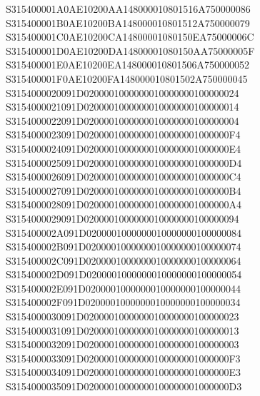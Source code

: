 \documentclass[12pt,a4paper]{article}
\begin{document}
\begin{framed}
{S315400001A0AE10200AA148000010801516A750000086\newline
S315400001B0AE10200BA148000010801512A750000079\newline
S315400001C0AE10200CA14800001080150EA75000006C\newline
S315400001D0AE10200DA14800001080150AA75000005F\newline
S315400001E0AE10200EA148000010801506A750000052\newline
S315400001F0AE10200FA148000010801502A750000045\newline
S3154000020091D0200001000000010000000100000024\newline
S3154000021091D0200001000000010000000100000014\newline
S3154000022091D0200001000000010000000100000004\newline
S3154000023091D02000010000000100000001000000F4\newline
S3154000024091D02000010000000100000001000000E4\newline
S3154000025091D02000010000000100000001000000D4\newline
S3154000026091D02000010000000100000001000000C4\newline
S3154000027091D02000010000000100000001000000B4\newline
S3154000028091D02000010000000100000001000000A4\newline
S3154000029091D0200001000000010000000100000094\newline
S315400002A091D0200001000000010000000100000084\newline
S315400002B091D0200001000000010000000100000074\newline
S315400002C091D0200001000000010000000100000064\newline
S315400002D091D0200001000000010000000100000054\newline
S315400002E091D0200001000000010000000100000044\newline
S315400002F091D0200001000000010000000100000034\newline
S3154000030091D0200001000000010000000100000023\newline
S3154000031091D0200001000000010000000100000013\newline
S3154000032091D0200001000000010000000100000003\newline
S3154000033091D02000010000000100000001000000F3\newline
S3154000034091D02000010000000100000001000000E3\newline
S3154000035091D02000010000000100000001000000D3\newline
}
\end{framed}
\end{document}
